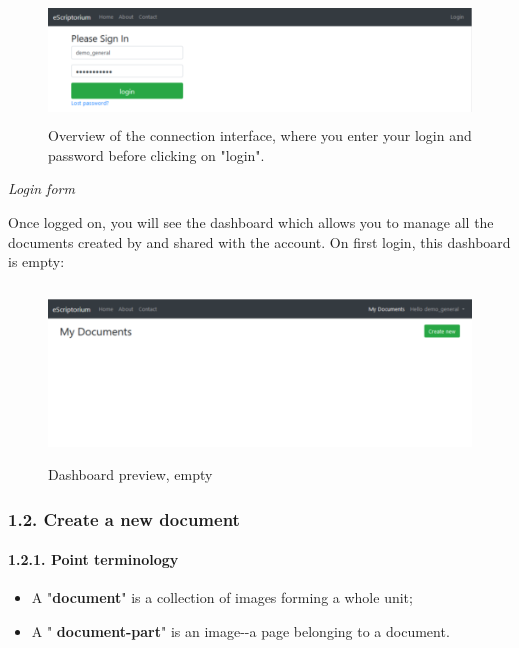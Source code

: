 \documentclass[
]{book}
\begin{document}
\begin{figure}
\centering
\includegraphics[width=5.20833in,height=1.27778in]{img/eScrTut/image1.png}
\caption{Overview of the connection interface, where you enter your login and
password before clicking on
"login".}
\end{figure}

\emph{Login form}

Once logged on, you will see the dashboard which allows you to manage
all the documents created by and shared with the account. On first
login, this dashboard is empty:

\begin{figure}
\centering
\includegraphics[width=5.20833in,height=1.81944in]{img/eScrTut/image2.png}
\caption{Dashboard preview,
empty}
\end{figure}

\hypertarget{create-a-new-document}{%
\subsubsection{1.2. Create a new document}\label{create-a-new-document}}

\hypertarget{point-terminology}{%
\paragraph{1.2.1. Point terminology}\label{point-terminology}}

\begin{itemize}
\item
  A "\textbf{document}" is a collection of images forming a whole unit;
\item
  A " \textbf{document-part}" is an image-\/-a page belonging to a
  document.
\end{itemize}
\end{document}
